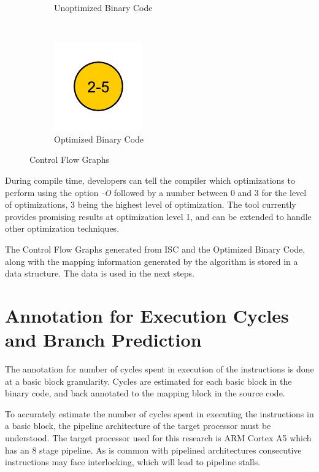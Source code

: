 \begin{figure}
\begin{subfigure}[t]{.33\textwidth}
\caption{Unoptimized Binary Code}
\label{fig:cfgUnopt}
\end{subfigure}%
~
\begin{subfigure}[t]{.33\textwidth}
\centering
\captionsetup{margin=10pt}
\includegraphics[width=.5\textwidth]{figures/CondExecObjOptFlowChart.pdf}
\caption{Optimized Binary Code}
\label{fig:cfgOpt}
\end{subfigure}
\caption{Control Flow Graphs}
\end{figure}

During compile time, developers can tell the compiler which optimizations to perform using the option \emph{-O} followed by a number between 0 and 3 for the level of optimizations, 3 being the highest level of optimization. The tool currently provides promising results at optimization level 1, and can be extended to handle other optimization techniques.

The Control Flow Graphs generated from ISC and the Optimized Binary Code, along with the mapping information generated by the algorithm is stored in a data structure. The data is used in the next steps.

\section{Annotation for Execution Cycles and Branch Prediction}
The annotation for number of cycles spent in execution of the instructions is done at a basic block granularity. Cycles are estimated for each basic block in the binary code, and back annotated to the mapping block in the source code.

To accurately estimate the number of cycles spent in executing the instructions in a basic block, the pipeline architecture of the target processor must be understood. The target processor used for this research is ARM Cortex A5 which has an 8 stage pipeline. As is common with pipelined architectures consecutive instructions may face interlocking, which will lead to pipeline stalls.

